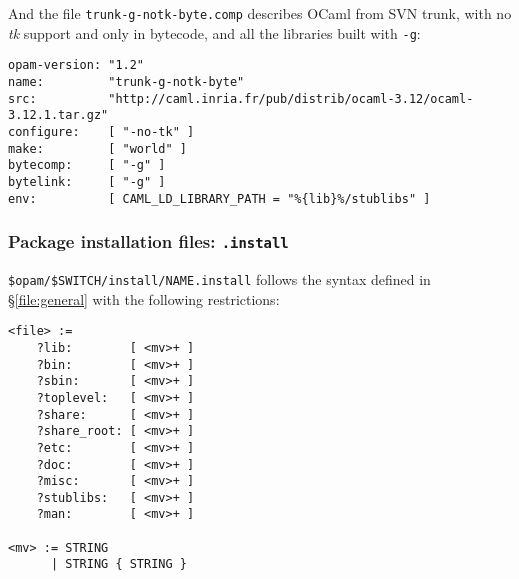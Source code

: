 \documentclass[a4paper,10pt]{article}
\begin{document}
And the file {\tt trunk-g-notk-byte.comp} describes OCaml from SVN
trunk, with no {\em tk} support and only in bytecode, and all the
libraries built with {\tt -g}:

\begin{verbatim}
opam-version: "1.2"
name:         "trunk-g-notk-byte"
src:          "http://caml.inria.fr/pub/distrib/ocaml-3.12/ocaml-3.12.1.tar.gz"
configure:    [ "-no-tk" ]
make:         [ "world" ]
bytecomp:     [ "-g" ]
bytelink:     [ "-g" ]
env:          [ CAML_LD_LIBRARY_PATH = "%{lib}%/stublibs" ]
\end{verbatim}


\subsubsection{Package installation files: {\tt *.install}}
\label{file:install}

\verb+$opam/$SWITCH/install/NAME.install+ follows the syntax defined
in \S\ref{file:general} with the following restrictions:

{\small
\begin{Verbatim}[frame=single]
<file> :=
    ?lib:        [ <mv>+ ]
    ?bin:        [ <mv>+ ]
    ?sbin:       [ <mv>+ ]
    ?toplevel:   [ <mv>+ ]
    ?share:      [ <mv>+ ]
    ?share_root: [ <mv>+ ]
    ?etc:        [ <mv>+ ]
    ?doc:        [ <mv>+ ]
    ?misc:       [ <mv>+ ]
    ?stublibs:   [ <mv>+ ]
    ?man:        [ <mv>+ ]

<mv> := STRING
      | STRING { STRING }
\end{Verbatim}
}
\end{document}
